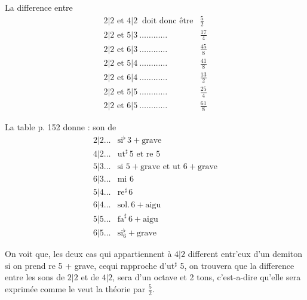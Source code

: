 \documentclass[11pt,a4paper]{article}
\begin{document}
La difference entre
\[
\begin{array}{lr}
2|2 \text{ et } 4|2 \ \text{ doit donc être} & \frac{5}{2}\\
2|2 \text{ et } 5|3\ \ldots\ldots\ldots\ldots & \frac{17}{4}\\
2|2 \text{ et } 6|3\ \ldots\ldots\ldots\ldots & \frac{45}{8}\\
2|2 \text{ et } 5|4\ \ldots\ldots\ldots\ldots & \frac{41}{8}\\
2|2 \text{ et } 6|4\ \ldots\ldots\ldots\ldots & \frac{13}{2}\\
2|2 \text{ et } 5|5\ \ldots\ldots\ldots\ldots & \frac{25}{4}\\
2|2 \text{ et } 6|5\ \ldots\ldots\ldots\ldots & \frac{61}{8}
\end{array}
\]

La table p. 152 donne : son de
\[
\begin{array}{ll}
2|2 \ldots & \text{si}^{\flat}\,3 + \text{grave}\\
4|2 \ldots & \text{ut}^{\sharp}\,5 \text{ et re }5\\
5|3 \ldots & \text{si }5 + \text{grave et ut }6 + \text{grave}\\
6|3 \ldots & \text{mi }6\\
5|4 \ldots & \text{re}^{\sharp}\,6\\
6|4 \ldots & \text{sol}.\,6 + \text{aigu}\\
5|5 \ldots & \text{fa}^{\sharp}\,6 + \text{aigu}\\
6|5 \ldots & \text{si}^{\flat}_{6} + \text{grave}
\end{array}
\]

On voit que, les deux cas qui appartiennent à $4|2$ different entr'eux
d'un demiton si on prend re 5 + grave, cequi rapproche d'ut$^{\sharp}$ 5, on trouvera
que la difference entre les sons de $2|2$ et de $4|2$, sera d'un octave
et 2 tons, c'est-a-dire qu'elle sera exprimée comme le veut la théorie par $\frac{5}{2}$.

\end{document}
